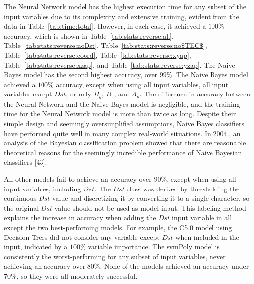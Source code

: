 \documentclass[sn-mathphys-num]{sn-jnl}%
\begin{document}
The Neural Network model has the highest execution time for any subset of the input variables due to its complexity and extensive training, evident from the data in Table~\ref{tab:time:total}. However, in each case, it achieved a $100\%$ accuracy, which is shown in Table~\ref{tab:stats:reverse:all}, Table~\ref{tab:stats:reverse:noDst}, Table~\ref{tab:stats:reverse:no$TEC$}, Table~\ref{tab:stats:reverse:coord}, Table~\ref{tab:stats:reverse:xyap}, Table~\ref{tab:stats:reverse:xzap}, and Table~\ref{tab:stats:reverse:yzap}. The Naive Bayes model has the second highest accuracy, over $99\%$. The Naive Bayes model achieved a $100\%$ accuracy, except when using all input variables, all input variables except $Dst$, or only $B_{y}$, $B_{z}$, and $A_{p}$. The difference in accuracy between the Neural Network and the Naive Bayes model is negligible, and the training time for the Neural Network model is more than twice as long. Despite their simple design and seemingly oversimplified assumptions, Naive Bayes classifiers have performed quite well in many complex real-world situations. In 2004., an analysis of the Bayesian classification problem showed that there are reasonable theoretical reasons for the seemingly incredible performance of Naive Bayesian classifiers [43].

All other models fail to achieve an accuracy over $90\%$, except when using all input variables, including $Dst$. The $Dst$ class was derived by thresholding the continuous $Dst$ value and discretizing it by converting it to a single character, so the original $Dst$ value should not be used as model input. This labeling method explains the increase in accuracy when adding the $Dst$ input variable in all except the two best-performing models. For example, the C5.0 model using Decision Trees did not consider any variable except $Dst$ when included in the input, indicated by a $100\%$ variable importance. The svmPoly model is consistently the worst-performing for any subset of input variables, never achieving an accuracy over $80\%$. None of the models achieved an accuracy under $70\%$, so they were all moderately successful.
\end{document}
